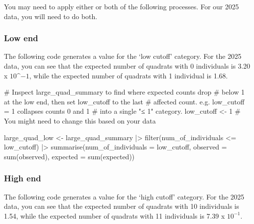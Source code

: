 \documentclass[
  letterpaper,
  DIV=11,
  numbers=noendperiod]{scrreprt}
\newenvironment{Shaded}{\begin{snugshade}}{\end{snugshade}}
\newcommand{\AttributeTok}[1]{\textcolor[rgb]{0.40,0.45,0.13}{#1}}
\newcommand{\CommentTok}[1]{\textcolor[rgb]{0.37,0.37,0.37}{#1}}
\newcommand{\DecValTok}[1]{\textcolor[rgb]{0.68,0.00,0.00}{#1}}
\newcommand{\FunctionTok}[1]{\textcolor[rgb]{0.28,0.35,0.67}{#1}}
\newcommand{\NormalTok}[1]{\textcolor[rgb]{0.00,0.23,0.31}{#1}}
\newcommand{\OtherTok}[1]{\textcolor[rgb]{0.00,0.23,0.31}{#1}}
\newcommand{\SpecialCharTok}[1]{\textcolor[rgb]{0.37,0.37,0.37}{#1}}
\begin{document}
You may need to apply either or both of the following processes. For our
2025 data, you will need to do both.

\subsubsection{Low end}\label{low-end}

The following code generates a value for the `low cutoff' category. For
the 2025 data, you can see that the expected number of quadrats with 0
individuals is 3.20 x \(10\^{-1}\), while the expected number of
quadrats with 1 individual is 1.68.

\begin{Shaded}
\begin{Highlighting}[]
\CommentTok{\# Inspect large\_quad\_summary to find where expected counts drop}
\CommentTok{\# below 1 at the low end, then set low\_cutoff to the last}
\CommentTok{\# affected count. e.g. low\_cutoff = 1 collapses counts 0 and 1}
\CommentTok{\# into a single "≤ 1" category.}
\NormalTok{low\_cutoff }\OtherTok{\textless{}{-}} \DecValTok{1} \CommentTok{\# You might need to change this based on your data}

\NormalTok{large\_quad\_low }\OtherTok{\textless{}{-}}\NormalTok{ large\_quad\_summary }\SpecialCharTok{|\textgreater{}}
  \FunctionTok{filter}\NormalTok{(num\_of\_individuals }\SpecialCharTok{\textless{}=}\NormalTok{ low\_cutoff) }\SpecialCharTok{|\textgreater{}}
  \FunctionTok{summarise}\NormalTok{(}\AttributeTok{num\_of\_individuals =}\NormalTok{ low\_cutoff,}
            \AttributeTok{observed =} \FunctionTok{sum}\NormalTok{(observed),}
            \AttributeTok{expected =} \FunctionTok{sum}\NormalTok{(expected))}
\end{Highlighting}
\end{Shaded}

\subsubsection{High end}\label{high-end}

The following code generates a value for the `high cutoff' category. For
the 2025 data, you can see that the expected number of quadrats with 10
individuals is 1.54, while the expected number of quadrats with 11
individuals is 7.39 x \(10^{-1}\).
\end{document}
